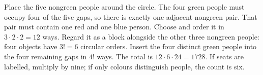 Place the five nongreen people around the circle. The four green people must occupy four of the five gaps, so there is exactly one adjacent nongreen pair. That pair must contain one red and one blue person. Choose and order it in $3\cdot2\cdot2=12$ ways. Regard it as a block alongside the other three nongreen people: four objects have $3!=6$ circular orders. Insert the four distinct green people into the four remaining gaps in $4!$ ways. The total is $12\cdot6\cdot24=\boxed{1728}$. If seats are labelled, multiply by nine; if only colours distinguish people, the count is six.
